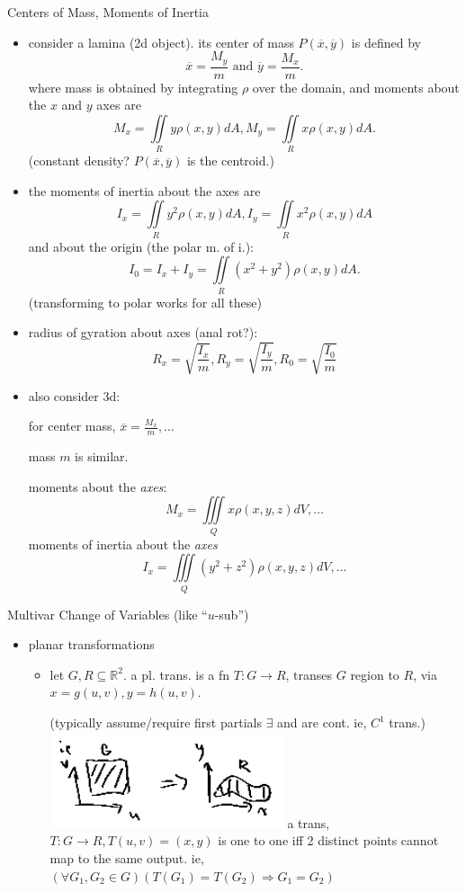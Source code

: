 \documentclass[11pt]{article}
\theoremstyle{definition}
\newcommand{\col}[1]{\begin{minipage}{\columnwidth}#1\end{minipage}}
\begin{document}
\begin{multicols}{2}
  \col{
    Centers of Mass, Moments of Inertia
    \begin{itemize}
      \item consider a lamina (2d object). its center of mass $P(\overline{x},\overline{y})$ is defined by
      \[ \overline{x} = \frac{M_y}{m} \text{ and } \overline{y} = \frac{M_x}{m}. \]
      where mass is obtained by integrating $\rho$ over the domain, and moments about the $x$ and $y$ axes are
      \[ M_x = \iint\limits_R y\rho(x,y)dA, M_y = \iint\limits_R x\rho(x,y)dA. \]
      (constant density? $P(\overline{x},\overline{y})$ is the centroid.)
      \item the moments of inertia about the axes are
      \[ I_x = \iint\limits_R y^2\rho(x,y)dA, I_y = \iint\limits_R x^2\rho(x,y)dA \]
      and about the origin (the polar m. of i.):
      \[ I_0 = I_x + I_y = \iint\limits_R (x^2+y^2)\rho(x,y)dA. \]
      (transforming to polar works for all these)
      \item radius of gyration about axes (anal rot?):
      \[ R_x = \sqrt{\frac{I_x}{m}}, R_y = \sqrt{\frac{I_y}{m}}, R_0 = \sqrt{\frac{I_0}{m}} \]
      \item also consider 3d:
      
      for center mass, $\overline{x}=\frac{M_x}{m}, \dots$

      mass $m$ is similar.

      moments about the \emph{axes}:
      \[ M_x=\iiint\limits_Q x\rho(x,y,z)dV, \dots \]
      moments of inertia about the \emph{axes}
      \[ I_x = \iiint\limits_Q (y^2+z^2)\rho(x,y,z)dV, \dots \]
    \end{itemize}
  }
  \col{
    Multivar Change of Variables (like ``$u$-sub'')

    \begin{itemize}
      \item planar transformations
      \begin{itemize}
        \item let $G,R\subseteq \mathbb{R}^2$. a pl. trans. is a fn $T:G\rightarrow R$, transes $G$ region to $R$, via $x=g(u,v), y=h(u,v)$.
        
        (typically assume/require first partials $\exists$ and are cont. ie, $C^1$ trans.)
        \includegraphics[width=2.7in]{planar_transformations_for_usub.png}
        a trans, $T: G\rightarrow R, T(u,v)=(x,y)$ is one to one iff 2 distinct points cannot map to the same output. ie, $(\forall G_1, G_2\in G)(T(G_1) = T(G_2) \Rightarrow G_1 = G_2)$ 


\end{itemize}
\end{itemize}}
\end{multicols}
\end{document}

